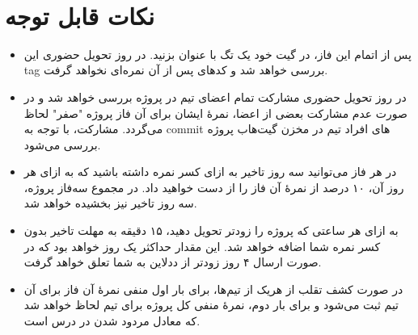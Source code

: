 \documentclass[]{article}
\begin{document}
\newpage
\pagestyle{fancy}
\fancyhf{}
\fancyfoot{}
\cfoot{\thepage}
\renewcommand{\headrulewidth}{2pt}

\KashidaOff



\tableofcontents

\newpage

 \Large \textbf{\\
}



\section*{{\titr نکات قابل توجه}}
\begin{itemize}
\item
پس از اتمام این فاز، در گیت خود یک تگ با عنوان  بزنید. در روز تحویل حضوری این tag بررسی خواهد شد و کدهای پس از آن نمره‌ای نخواهد گرفت.

\item
در روز تحویل حضوری مشارکت تمام اعضای تیم در پروژه بررسی خواهد‌ شد و در صورت عدم مشارکت بعضی از اعضا، نمرهٔ ایشان برای آن فاز پروژه "صفر" لحاظ می‌گردد. مشارکت، با توجه به commit های افراد تیم در مخزن گیت‌هاب پروژه بررسی می‌شود.

\item
در هر فاز می‌توانید سه روز تاخیر به ازای کسر نمره داشته‌ باشید که به ازای هر روز آن، ۱۰ درصد از نمرهٔ آن فاز را از دست خواهید‌ داد. در مجموع سه‌فاز پروژه، سه روز تاخیر نیز بخشیده خواهد‌ شد.

\item
به ازای هر ساعتی که پروژه را زودتر تحویل دهید، ۱۵ دقیقه به مهلت تاخیر بدون کسر نمره شما اضافه خواهد‌ شد. این مقدار حداکثر یک روز خواهد‌ بود که در صورت ارسال ۴ روز زودتر از ددلاین به شما تعلق خواهد گرفت.

\item
در صورت کشف تقلب از هریک از تیم‌ها، برای بار اول منفی نمرهٔ آن فاز برای آن تیم ثبت می‌شود و برای بار دوم، نمرهٔ منفی کل پروژه برای تیم لحاظ خواهد‌ شد که معادل مردود شدن در درس است.
\end{itemize}
\end{document}
